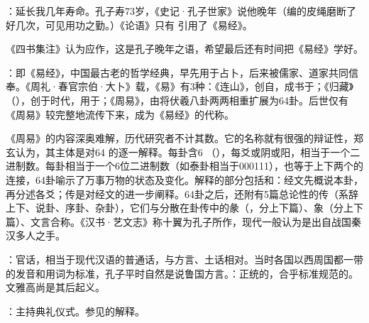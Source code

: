 {
\item {}：延长我几年寿命。孔子寿73岁，《史记·孔子世家》说他晚年（编的皮绳磨断了好几次，可见用功之勤。）《论语》只有  引用了《易经》。

《四书集注》认为应作，这是孔子晚年之语，希望最后还有时间把《易经》学好。

\item {}：即《易经》，中国最古老的哲学经典，早先用于占卜，后来被儒家、道家共同信奉。《周礼·春官宗伯·大卜》载，《易》有3种：《连山》，创自，成书于；《归藏》（），创于时代，用于；《周易》，由将伏羲八卦两两相重扩展为64卦。后世仅有《周易》较完整地流传下来，成为《易经》的代称。

《周易》的内容深奥难解，历代研究者不计其数。它的名称就有很强的辩证性，郑玄认为，其主体是对64 的逐一解释。每卦含6 （），每爻或阴或阳，相当于一个二进制数。每卦相当于一个6位二进制数（如泰卦相当于000111），也等于上下两个的连接，64卦喻示了万事万物的状态及变化。解释的部分包括和：经文先概说本卦，再分述各爻；传是对经文的进一步阐释。64卦之后，还附有5篇总论性的传（系辞上下、说卦、序卦、杂卦），它们与分散在卦传中的彖（，分上下篇）、象（分上下篇）、文言合称。《汉书·艺文志》称十翼为孔子所作，现代一般认为是出自战国秦汉多人之手。
}
{}


{
\item {}：官话，相当于现代汉语的普通话，与方言、土话相对。当时各国以西周国都一带的发音和用词为标准，孔子平时自然是说鲁国方言。：正统的，合乎标准规范的。文雅高尚是其后起义。
\item {}：主持典礼仪式。参见的解释。
}
{}


